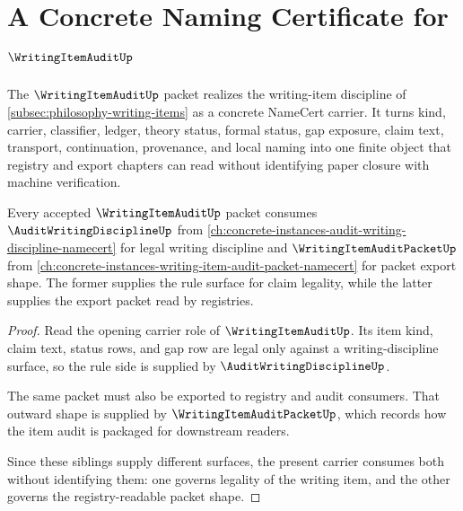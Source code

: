 \chapter{A Concrete Naming Certificate for $\WritingItemAuditUp$}
\label{ch:concrete-instances-writingitemaudit-namecert}

The $\WritingItemAuditUp$ packet realizes the writing-item discipline of \autoref{subsec:philosophy-writing-items} as a concrete NameCert carrier. It turns kind, carrier, classifier, ledger, theory status, formal status, gap exposure, claim text, transport, continuation, provenance, and local naming into one finite object that registry and export chapters can read without identifying paper closure with machine verification.

\begin{theorem}
\label{thm:writing-item-audit-sibling-dependency}
Every accepted $\WritingItemAuditUp$ packet consumes $\AuditWritingDisciplineUp$ from \autoref{ch:concrete-instances-audit-writing-discipline-namecert} for legal writing discipline and $\WritingItemAuditPacketUp$ from \autoref{ch:concrete-instances-writing-item-audit-packet-namecert} for packet export shape. The former supplies the rule surface for claim legality, while the latter supplies the export packet read by registries.
\end{theorem}
\begin{proof}
Read the opening carrier role of $\WritingItemAuditUp$. Its item kind, claim text, status rows, and gap row are legal only against a writing-discipline surface, so the rule side is supplied by $\AuditWritingDisciplineUp$.

The same packet must also be exported to registry and audit consumers. That outward shape is supplied by $\WritingItemAuditPacketUp$, which records how the item audit is packaged for downstream readers.

Since these siblings supply different surfaces, the present carrier consumes both without identifying them: one governs legality of the writing item, and the other governs the registry-readable packet shape.
\end{proof}



